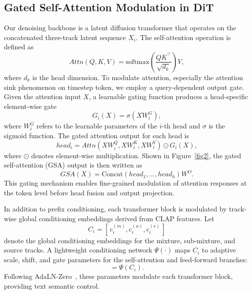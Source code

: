 \documentclass[lettersize,journal]{IEEEtran}
\begin{document}
\subsection{Gated Self-Attention Modulation in DiT}
\label{4.3}
Our denoising backbone is a latent diffusion transformer \cite{evans2024long} that operates on the concatenated three-track latent sequence $X_i$. The self-attention operation is defined as
\begin{equation}
      Attn(Q,K,V)=\mathrm{softmax}\!\left(\frac{QK^\top}{\sqrt{d_k}}\right)V,
\end{equation}
where $d_k$ is the head dimension. To modulate attention, especially the attention sink phenomenon on timestep token, we employ a query-dependent output gate. Given the attention input $X$, a learnable gating function produces a head-specific element-wise gate
\begin{equation}
      G_i(X)=\sigma\!\left(XW^{G}_i\right),
\end{equation}
where $W^{G}_i$ refers to the learnable parameters of the $i$-th head and $\sigma$ is the sigmoid function. The gated attention output for each head is
\begin{equation}
      head_i=
      Attn(XW_i^Q,XW_i^K,XW_i^V) \odot G_i(X),
\end{equation}
where $\odot$ denotes element-wise multiplication. Shown in Figure~\ref{fig2}, the gated self-attention (GSA) output is then written as
\begin{equation}
      GSA(X)=
      \mathrm{Concat}\!\left(head_1,\ldots,head_h\right)W^{O}.
\end{equation}
This gating mechanism enables fine-grained modulation of attention responses at the token level before head fusion and output projection.

In addition to prefix conditioning, each transformer block is modulated by track-wise global conditioning embeddings derived from CLAP features. Let
\begin{equation}
        C_i=[\,c_i^{(m)},c_i^{(u)},c_i^{(s)}\,]
\end{equation}
denote the global conditioning embeddings for the mixture, sub-mixture, and source tracks. A lightweight conditioning network $\Psi(\cdot)$ maps $C_i$ to adaptive scale, shift, and gate parameters for the self-attention and feed-forward branches:
\begin{equation} [s_{\mathrm{self}},b_{\mathrm{self}},g_{\mathrm{self}},s_{\mathrm{ff}},b_{\mathrm{ff}},g_{\mathrm{ff}}]=\Psi(C_i).
\end{equation}
Following AdaLN-Zero~\cite{peebles2023scalable}, these parameters modulate each transformer block, providing text semantic control.
\end{document}

